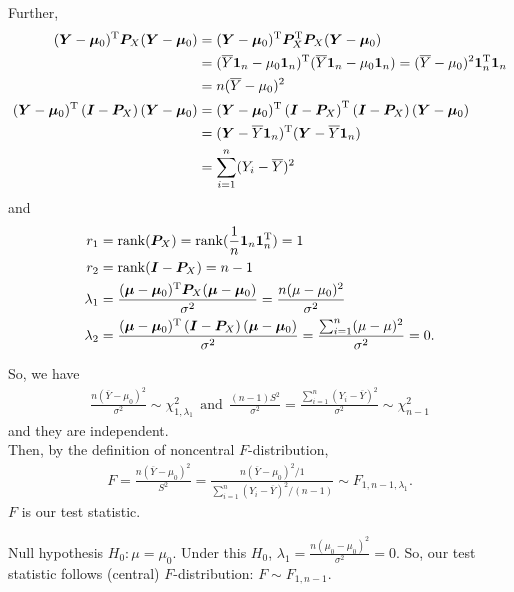 Further,
\begin{align*}
(\bm{Y} - \bm{\mu}_{0})^{\rm T}\bm{P}_{X}(\bm{Y} - \bm{\mu}_{0}) &= (\bm{Y} - \bm{\mu}_{0})^{\rm T}\bm{P}_{X}^{\rm T}\bm{P}_{X}(\bm{Y} - \bm{\mu}_{0})\\
&= (\overline{Y}\bm{1}_{n} - \mu_{0}\bm{1}_{n})^{\rm T}(\overline{Y}\bm{1}_{n} - \mu_{0}\bm{1}_{n}) = (\overline{Y} - \mu_{0})^2 \bm{1}_{n}^{\rm T}\bm{1}_{n}\\
&= n(\overline{Y} - \mu_{0})^2\\
(\bm{Y} - \bm{\mu}_{0})^{\rm T}\left(\bm{I} - \bm{P}_{X} \right)(\bm{Y} - \bm{\mu}_{0}) &= (\bm{Y} - \bm{\mu}_{0})^{\rm T}\left(\bm{I} - \bm{P}_{X} \right)^{\rm T}\left(\bm{I} - \bm{P}_{X} \right)(\bm{Y} - \bm{\mu}_{0})\\
&= (\bm{Y} - \overline{Y}\bm{1}_{n})^{\rm T}(\bm{Y} - \overline{Y}\bm{1}_{n})\\
&= \sum_{i=1}^{n} (Y_{i} - \overline{Y})^{2}
\end{align*}
and
\begin{align*}
r_{1} &= \mathrm{rank}(\bm{P}_{X}) = \mathrm{rank}(\frac{1}{n}\bm{1}_{n}\bm{1}_{n}^{\rm T}) = 1\\
r_{2} &= \mathrm{rank}(\bm{I} - \bm{P}_{X}) = n - 1\\
\lambda_{1} &= \frac{(\bm{\mu} - \bm{\mu}_{0})^{\rm T} \bm{P}_{X} (\bm{\mu} - \bm{\mu}_{0})}{\sigma^2} = \frac{n(\mu - \mu_{0})^2}{\sigma^2}\\
\lambda_{2} &= \frac{(\bm{\mu} - \bm{\mu}_{0})^{\rm T}\left(\bm{I} - \bm{P}_{X} \right)(\bm{\mu} - \bm{\mu}_{0})}{\sigma^2} = \frac{\sum_{i=1}^{n} (\mu - \mu)^{2}}{\sigma^2} = 0.
\end{align*}


So, we have 
\begin{align*}
\frac{n(\overline{Y} - \mu_{0})^2}{\sigma^2} \sim \chi_{1, \lambda_{1}}^2 ~~\mbox{and}~~ \frac{(n-1)S^2}{\sigma^2} = \frac{\sum_{i=1}^{n} (Y_{i} - \overline{Y})^{2}}{\sigma^2} \sim \chi_{n-1}^2
\end{align*}
and they are independent.\\

Then, by the definition of noncentral $F$-distribution,
\begin{align*}
F = \frac{n(\overline{Y} - \mu_{0})^2}{S^2} = \frac{n(\overline{Y} - \mu_{0})^2 / 1}{\sum_{i=1}^{n} (Y_{i} - \overline{Y})^{2} / (n-1)} \sim F_{1, n-1, \lambda_{1}}.
\end{align*}
$F$ is our test statistic.

Null hypothesis $H_{0}: \mu = \mu_{0}$. Under this $H_{0}$, $\lambda_{1} = \frac{n(\mu_{0} - \mu_{0})^2}{\sigma^2} = 0$. So, our test statistic follows (central) $F$-distribution: $F \sim F_{1, n-1}$.

